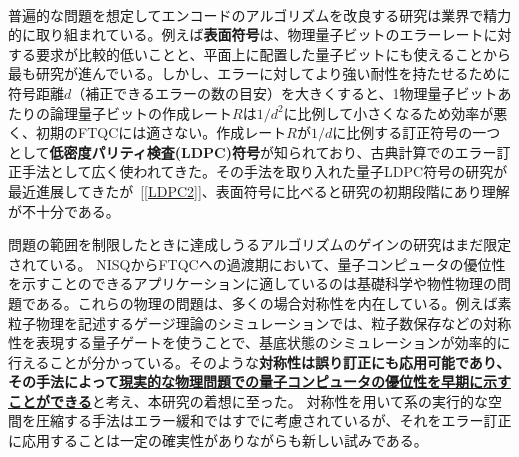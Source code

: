 \documentclass[11pt,a4j,dvipdfmx]{jarticle} 					%
\newcommand{\研究課題名}{誤り耐性量子コンピュータに向けた誤り訂正技術の開発(仮)}
\newcommand{\研究機関名}{東京大学}
\newcommand{\研究代表者氏名}{寺師弘二}
\newcommand{\研究期間の最終元号年度}{10}  %
\newcommand{\mybf}[1]{{\bfseries\sffamily#1}}
\begin{document}
\\
%
普遍的な問題を想定してエンコードのアルゴリズムを改良する研究は業界で精力的に取り組まれている。例えば\mybf{表面符号}は、物理量子ビットのエラーレートに対する要求が比較的低いことと、平面上に配置した量子ビットにも使えることから最も研究が進んでいる。しかし、エラーに対してより強い耐性を持たせるために符号距離$d$（補正できるエラーの数の目安）を大きくすると、1物理量子ビットあたりの論理量子ビットの作成レート$R$は$1/d^2$に比例して小さくなるため効率が悪く、初期のFTQCには適さない。作成レート$R$が$1/d$に比例する訂正符号の一つとして\mybf{低密度パリティ検査(LDPC)符号}が知られており、古典計算でのエラー訂正手法として広く使われてきた。その手法を取り入れた量子LDPC符号の研究が最近進展してきたが~[\ref{LDPC2}]、表面符号に比べると研究の初期段階にあり理解が不十分である。

問題の範囲を制限したときに達成しうるアルゴリズムのゲインの研究はまだ限定されている。
NISQからFTQCへの過渡期において、量子コンピュータの優位性を示すことのできるアプリケーションに適しているのは基礎科学や物性物理の問題である。これらの物理の問題は、多くの場合対称性を内在している。例えば素粒子物理を記述するゲージ理論のシミュレーションでは、粒子数保存などの対称性を表現する量子ゲートを使うことで、基底状態のシミュレーションが効率的に行えることが分かっている。そのような\mybf{対称性は誤り訂正にも応用可能であり、その手法によって\ul{現実的な物理問題での量子コンピュータの優位性を早期に示すことができる}}と考え、本研究の着想に至った。
対称性を用いて系の実行的な空間を圧縮する手法はエラー緩和ではすでに考慮されているが、それをエラー訂正に応用することは一定の確実性がありながらも新しい試みである。\\
\end{document}

